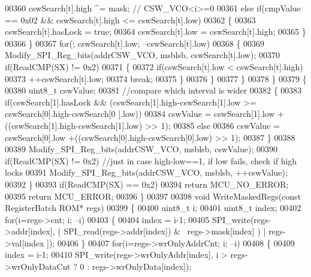 \begin{DoxyCode}
00360                     cswSearch[t].high ^= mask; \textcolor{comment}{// CSW\_VCO<i>=0}
00361                 \textcolor{keywordflow}{else} \textcolor{keywordflow}{if}(cmpValue == 0x02 && cswSearch[t].high <= cswSearch[t].low)
00362                 \{
00363                     cswSearch[t].hasLock = \textcolor{keyword}{true};
00364                     cswSearch[t].low = cswSearch[t].high;
00365                 \}
00366             \}
00367             \textcolor{keywordflow}{for}(; cswSearch[t].low; --cswSearch[t].low)
00368             \{
00369                 Modify_SPI_Reg_bits(addrCSW\_VCO, msblsb, cswSearch[t].low);
00370                 \textcolor{keywordflow}{if}(ReadCMP(SX) != 0x2)
00371                 \{
00372                     \textcolor{keywordflow}{if}(cswSearch[t].low < cswSearch[t].high)
00373                         ++cswSearch[t].low;
00374                     \textcolor{keywordflow}{break};
00375                 \}
00376             \}
00377         \}
00378     \}
00379     \{
00380         uint8\_t cswValue;
00381         \textcolor{comment}{//compare which interval is wider}
00382         \{
00383             \textcolor{keywordflow}{if}(cswSearch[1].hasLock && (cswSearch[1].high-cswSearch[1].low >= cswSearch[0].high-cswSearch[0
      ].low))
00384                 cswValue = cswSearch[1].low +((cswSearch[1].high-cswSearch[1].low) >> 1);
00385             \textcolor{keywordflow}{else}
00386                 cswValue = cswSearch[0].low +((cswSearch[0].high-cswSearch[0].low) >> 1);
00387         \}
00388 
00389         Modify_SPI_Reg_bits(addrCSW\_VCO, msblsb, cswValue);
00390         \textcolor{keywordflow}{if}(ReadCMP(SX) != 0x2) \textcolor{comment}{//just in case high-low==1, if low fails, check if high locks}
00391             Modify_SPI_Reg_bits(addrCSW\_VCO, msblsb, ++cswValue);
00392     \}
00393     \textcolor{keywordflow}{if}(ReadCMP(SX) == 0x2)
00394         \textcolor{keywordflow}{return} MCU_NO_ERROR;
00395     \textcolor{keywordflow}{return} MCU_ERROR;
00396 \}
00397 
00398 \textcolor{keywordtype}{void} WriteMaskedRegs(\textcolor{keyword}{const} RegisterBatch ROM* regs)
00399 \{
00400     uint8\_t i;
00401     uint8\_t index;
00402     \textcolor{keywordflow}{for}(i=regs->cnt; i; --i)
00403     \{
00404         index = i-1;
00405         SPI_write(regs->addr[index], ( SPI_read(regs->addr[index]) & ~regs->mask[index] ) | regs->val[index
      ]);
00406     \}
00407     \textcolor{keywordflow}{for}(i=regs->wrOnlyAddrCnt; i; --i)
00408     \{
00409         index = i-1;
00410         SPI_write(regs->wrOnlyAddr[index], i > regs->wrOnlyDataCnt ? 0 : regs->wrOnlyData[index]);

\end{DoxyCode}

